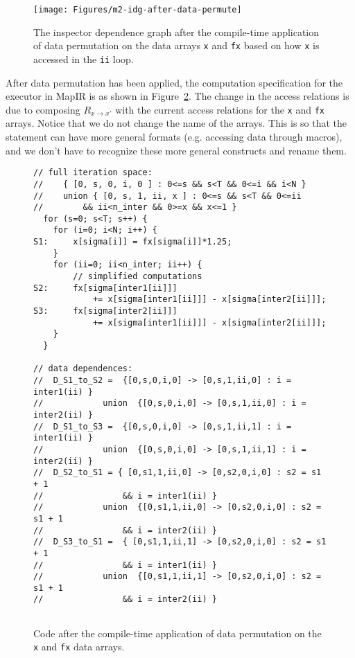 \documentclass{article}
\begin{document}
\begin{figure}[h!]
\texttt{[image: Figures/m2-idg-after-data-permute]}
\caption{The inspector dependence graph after the compile-time application of data permutation on the
data arrays {\tt x} and {\tt fx} based on how {\tt x} is accessed in the {\tt ii} loop.}
\label{fig:afterDataPermute}
\end{figure}

	
After data permutation has been applied, the computation specification for the executor in MapIR is as shown in Figure~\ref{fig:codeAfterDataPermute}.
The change in the access relations is due to composing $R_{x \rightarrow x'}$ with the current access relations
for the {\tt x} and {\tt fx} arrays.  
Notice that we do not change the name of the arrays.  This is so that the statement can have more general formats (e.g. accessing data through macros), and we don't have to recognize these more general constructs and rename them.


\begin{figure}
\begin{verbatim}
// full iteration space:
//    { [0, s, 0, i, 0 ] : 0<=s && s<T && 0<=i && i<N }
//    union { [0, s, 1, ii, x ] : 0<=s && s<T && 0<=ii 
//        && ii<n_inter && 0>=x && x<=1 }
  for (s=0; s<T; s++) {
    for (i=0; i<N; i++) {
S1:     x[sigma[i]] = fx[sigma[i]]*1.25;
    }
    for (ii=0; ii<n_inter; ii++) {
        // simplified computations
S2:     fx[sigma[inter1[ii]]] 
            += x[sigma[inter1[ii]]] - x[sigma[inter2[ii]]]; 
S3:     fx[sigma[inter2[ii]]] 
            += x[sigma[inter1[ii]]] - x[sigma[inter2[ii]]]; 
    }
  }
  
// data dependences:
//  D_S1_to_S2 =  {[0,s,0,i,0] -> [0,s,1,ii,0] : i = inter1(ii) }
//            union  {[0,s,0,i,0] -> [0,s,1,ii,0] : i = inter2(ii) }
//  D_S1_to_S3 =  {[0,s,0,i,0] -> [0,s,1,ii,1] : i = inter1(ii) }
//            union  {[0,s,0,i,0] -> [0,s,1,ii,1] : i = inter2(ii) }
//  D_S2_to_S1 = { [0,s1,1,ii,0] -> [0,s2,0,i,0] : s2 = s1 + 1 
//                && i = inter1(ii) }
//            union  {[0,s1,1,ii,0] -> [0,s2,0,i,0] : s2 = s1 + 1 
//                && i = inter2(ii) }
//  D_S3_to_S1 =  { [0,s1,1,ii,1] -> [0,s2,0,i,0] : s2 = s1 + 1 
//                && i = inter1(ii) }
//            union  {[0,s1,1,ii,1] -> [0,s2,0,i,0] : s2 = s1 + 1 
//                && i = inter2(ii) }
  
\end{verbatim}
\caption{Code after the compile-time application of data permutation on the
{\tt x} and {\tt fx} data arrays.}
\label{fig:codeAfterDataPermute}
\end{figure}
\end{document}

